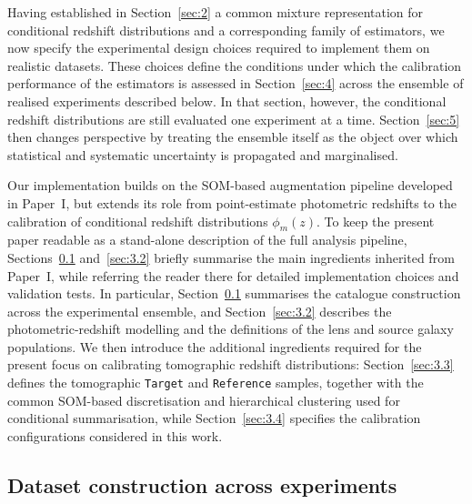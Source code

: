 Having established in Section~\ref{sec:2} a common mixture representation for conditional redshift distributions and a corresponding family of estimators, we now specify the experimental design choices required to implement them on realistic datasets. These choices define the conditions under which the calibration performance of the estimators is assessed in Section~\ref{sec:4} across the ensemble of realised experiments described below. In that section, however, the conditional redshift distributions are still evaluated one experiment at a time. Section~\ref{sec:5} then changes perspective by treating the ensemble itself as the object over which statistical and systematic uncertainty is propagated and marginalised.

Our implementation builds on the SOM-based augmentation pipeline developed in Paper~I, but extends its role from point-estimate photometric redshifts to the calibration of conditional redshift distributions \(\phi_m(z)\). To keep the present paper readable as a stand-alone description of the full analysis pipeline, Sections~\ref{sec:3.1} and~\ref{sec:3.2} briefly summarise the main ingredients inherited from Paper~I, while referring the reader there for detailed implementation choices and validation tests. In particular, Section~\ref{sec:3.1} summarises the catalogue construction across the experimental ensemble, and Section~\ref{sec:3.2} describes the photometric-redshift modelling and the definitions of the lens and source galaxy populations. We then introduce the additional ingredients required for the present focus on calibrating tomographic redshift distributions: Section~\ref{sec:3.3} defines the tomographic \texttt{Target} and \texttt{Reference} samples, together with the common SOM-based discretisation and hierarchical clustering used for conditional summarisation, while Section~\ref{sec:3.4} specifies the calibration configurations considered in this work.

\subsection{Dataset construction across experiments} \label{sec:3.1}

